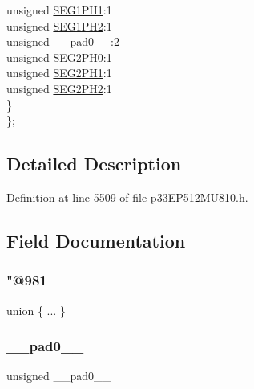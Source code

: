 \begin{DoxyCompactItemize}
\begin{tabbing}
\>\>unsigned \hyperlink{structtag_c2_c_f_g2_b_i_t_s_a2ea6021666df7ddae988097c241776ec}{SEG1PH1}:1\\
\>\>unsigned \hyperlink{structtag_c2_c_f_g2_b_i_t_s_a9403fb28f56e759f1fda0dbe1329530e}{SEG1PH2}:1\\
\>\>unsigned \hyperlink{structtag_c2_c_f_g2_b_i_t_s_adf71f3d8410c1f1dbbc96680a92c49af}{\_\_pad0\_\_}:2\\
\>\>unsigned \hyperlink{structtag_c2_c_f_g2_b_i_t_s_a6b5b806dc664c2ae31bf662fa46431bf}{SEG2PH0}:1\\
\>\>unsigned \hyperlink{structtag_c2_c_f_g2_b_i_t_s_aab8d5f089bad40bef0386f8b84ead0b7}{SEG2PH1}:1\\
\>\>unsigned \hyperlink{structtag_c2_c_f_g2_b_i_t_s_a0c3b275225d845ea8ee18e93711b60df}{SEG2PH2}:1\\
\>\} \\
\}; \\

\end{tabbing}\end{DoxyCompactItemize}


\subsection{Detailed Description}


Definition at line 5509 of file p33\+E\+P512\+M\+U810.\+h.



\subsection{Field Documentation}
\mbox{\label{structtag_c2_c_f_g2_b_i_t_s_a70bbbbd27ecf5ec8431aa6919616e8bf}} 
\subsubsection{\texorpdfstring{"@981}{@981}}
{\footnotesize\ttfamily union \{ ... \} }

\mbox{\label{structtag_c2_c_f_g2_b_i_t_s_adf71f3d8410c1f1dbbc96680a92c49af}} 
\subsubsection{\texorpdfstring{\+\_\+\+\_\+pad0\+\_\+\+\_\+}{\_\_pad0\_\_}}
{\footnotesize\ttfamily unsigned \+\_\+\+\_\+pad0\+\_\+\+\_\+}




